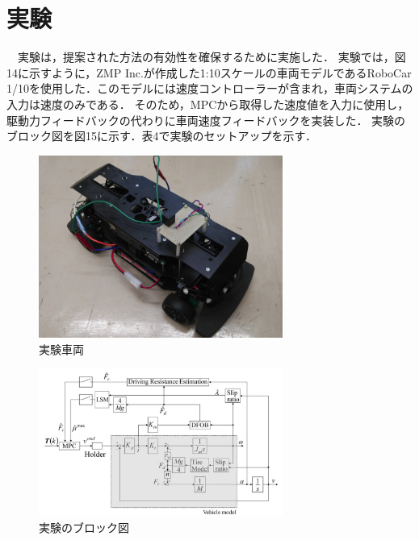 \newpage
\newpage

\section{実験}
　実験は，提案された方法の有効性を確保するために実施した． 実験では，図14に示すように，ZMP Inc.が作成した1:10スケールの車両モデルであるRoboCar 1/10を使用した．このモデルには速度コントローラーが含まれ，車両システムの入力は速度のみである． そのため，MPCから取得した速度値を入力に使用し，駆動力フィードバックの代わりに車両速度フィードバックを実装した． 実験のブロック図を図15に示す．表4で実験のセットアップを示す．
\begin{figure}[H]
    \centering
    \includegraphics[width=8cm]{./fig/fig14.png}
    \caption{実験車両}
\end{figure}
\begin{figure}[H]
    \centering
    \includegraphics[width=8cm]{./fig/fig15.png}
    \caption{実験のブロック図}
\end{figure}

